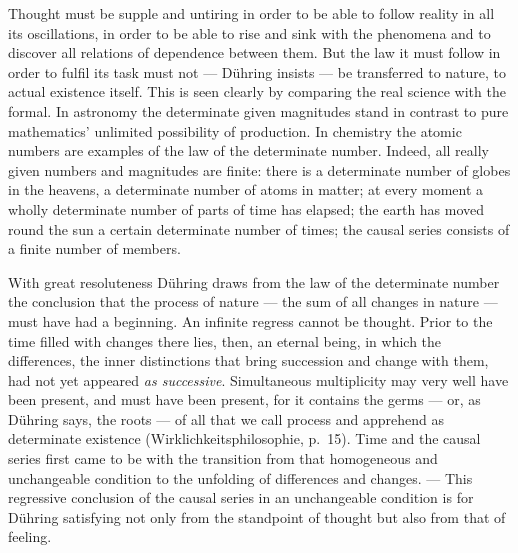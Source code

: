 \documentclass[12pt,a4paper]{book}
\newcommand{\opage}[1]{\marginnote{\footnotesize\textit{[#1]}}}
\begin{document}
Thought must be supple and untiring in order to be able to follow reality in all
its oscillations, in order to be able to rise and \opage{558}sink with the phenomena and to
discover all relations of dependence between them. But the law it must follow in
order to fulfil its task must not --- Dühring insists --- be transferred to
nature, to actual existence itself. This is seen clearly by comparing the real
science with the formal. In astronomy the determinate given magnitudes stand in
contrast to pure mathematics' unlimited possibility of production. In chemistry
the atomic numbers are examples of the law of the determinate number. Indeed, all
really given numbers and magnitudes are finite: there is a determinate number of
globes in the heavens, a determinate number of atoms in matter; at every moment a
wholly determinate number of parts of time has elapsed; the earth has moved round
the sun a certain determinate number of times; the causal series consists of a
finite number of members.

With great resoluteness Dühring draws from the law of the determinate number the
conclusion that the process of nature --- the sum of all changes in nature ---
must have had a beginning. An infinite regress cannot be thought. Prior to the
time filled with changes there lies, then, an eternal being, in which the
differences, the inner distinctions that bring succession and change with them,
had not yet appeared \emph{as successive}. Simultaneous multiplicity may very
well have been present, and must have been present, for it contains the germs
--- or, as Dühring says, the roots --- of all that we call process and apprehend
as determinate existence (Wirklichkeitsphilosophie, p.~15). Time and the causal
series first came to be with the transition from that homogeneous and
unchangeable condition to the unfolding of differences and changes. --- This
regressive conclusion of the causal series in an unchangeable condition is for
Dühring satisfying not only from the standpoint of thought but also from that of
feeling.
\end{document}
